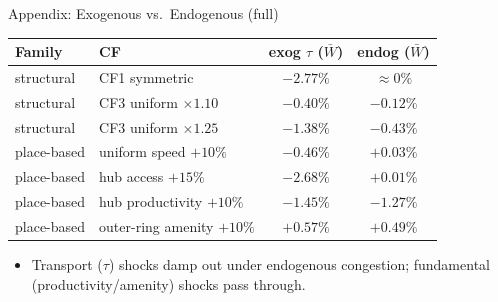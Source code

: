 \documentclass[11pt,aspectratio=169]{beamer}
\newcommand{\back}[1]{\hyperlink{#1}{\beamerreturnbutton{back}}}
\begin{document}
\begin{frame}[label=appexog]{Appendix: Exogenous vs.\ Endogenous (full)}
\scriptsize
\begin{center}
\begin{tabular}{llcc}
\toprule
Family & CF & exog $\tau$ ($\bar W$) & endog ($\bar W$) \\
\midrule
structural & CF1 symmetric & $-2.77\%$ & $\approx 0\%$ \\
structural & CF3 uniform $\times1.10$ & $-0.40\%$ & $-0.12\%$ \\
structural & CF3 uniform $\times1.25$ & $-1.38\%$ & $-0.43\%$ \\
place-based & uniform speed $+10\%$ & $-0.46\%$ & $+0.03\%$ \\
place-based & hub access $+15\%$ & $-2.68\%$ & $+0.01\%$ \\
place-based & hub productivity $+10\%$ & $-1.45\%$ & $-1.27\%$ \\
place-based & outer-ring amenity $+10\%$ & $+0.57\%$ & $+0.49\%$ \\
\bottomrule
\end{tabular}
\end{center}
\vspace{0.3em}
\begin{itemize}\footnotesize
  \item Transport ($\tau$) shocks damp out under endogenous congestion; fundamental (productivity/amenity) shocks pass through.
\end{itemize}
\centering\back{data}
\end{frame}
\end{document}
